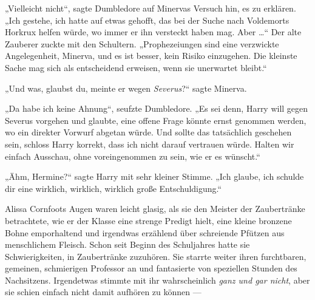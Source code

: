„Vielleicht nicht“, sagte Dumbledore auf Minervas Versuch hin, es zu erklären.
„Ich gestehe, ich hatte auf etwas gehofft, das bei der Suche nach Voldemorts Horkrux helfen würde, wo immer er ihn versteckt haben mag. Aber …“ Der alte Zauberer zuckte mit den Schultern.
„Prophezeiungen sind eine verzwickte Angelegenheit, Minerva, und es ist besser, kein Risiko einzugehen. Die kleinste Sache mag sich als entscheidend erweisen, wenn sie unerwartet bleibt.“

„Und was, glaubst du, meinte er wegen \emph{Severus}?“ sagte Minerva.

„Da habe ich keine Ahnung“, seufzte Dumbledore.
„Es sei denn, Harry will gegen Severus vorgehen und glaubte, eine offene Frage könnte ernst genommen werden, wo ein direkter Vorwurf abgetan würde. Und sollte das tatsächlich geschehen sein, schloss Harry korrekt, dass ich nicht darauf vertrauen würde. Halten wir einfach Ausschau, ohne voreingenommen zu sein, wie er es wünscht.“


„Ähm, Hermine?“ sagte Harry mit sehr kleiner Stimme.
„Ich glaube, ich schulde dir eine wirklich, wirklich, wirklich große Entschuldigung.“


Alissa Cornfoots Augen waren leicht glasig, als sie den Meister der Zaubertränke betrachtete, wie er der Klasse eine strenge Predigt hielt, eine kleine bronzene Bohne emporhaltend und irgendwas erzählend über schreiende Pfützen aus menschlichem Fleisch. Schon seit Beginn des Schuljahres hatte sie Schwierigkeiten, in Zaubertränke zuzuhören. Sie starrte weiter ihren furchtbaren, gemeinen, schmierigen Professor an und fantasierte von speziellen Stunden des Nachsitzens. Irgendetwas stimmte mit ihr wahrscheinlich \emph{ganz und gar nicht}, aber sie schien einfach nicht damit aufhören zu können —

